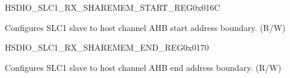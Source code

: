 \begin{register}{H}{SDIO\_SLC1\_RX\_SHAREMEM\_START\_REG}{0x016C}\label{regdesc:SDIOSLC1RXSHAREMEMSTARTREG}
%
\regnewline%
\begin{regdesc}\begin{reglist}
\label{fielddesc:SDIOSDIOSLC1RXSHAREMEMSTARTADDR}\item [SDIO\_SDIO\_SLC1\_RX\_SHAREMEM\_START\_ADDR] Configures SLC1 slave to host channel AHB start address boundary. (R/W)
\end{reglist}\end{regdesc}
\end{register}


\begin{register}{H}{SDIO\_SLC1\_RX\_SHAREMEM\_END\_REG}{0x0170}\label{regdesc:SDIOSLC1RXSHAREMEMENDREG}
%
\regnewline%
\begin{regdesc}\begin{reglist}
\label{fielddesc:SDIOSDIOSLC1RXSHAREMEMENDADDR}\item [SDIO\_SDIO\_SLC1\_RX\_SHAREMEM\_END\_ADDR] Configures SLC1 slave to host channel AHB end address boundary. (R/W)
\end{reglist}\end{regdesc}
\end{register}


